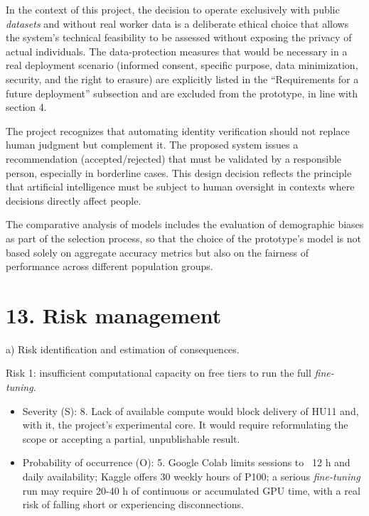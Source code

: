 \documentclass[
  11pt, %
]{charter}
\begin{document}
In the context of this project, the decision to operate exclusively with public \textit{datasets} and without real worker data is a deliberate ethical choice that allows the system's technical feasibility to be assessed without exposing the privacy of actual individuals. The data-protection measures that would be necessary in a real deployment scenario (informed consent, specific purpose, data minimization, security, and the right to erasure) are explicitly listed in the ``Requirements for a future deployment'' subsection and are excluded from the prototype, in line with section 4.

The project recognizes that automating identity verification should not replace human judgment but complement it. The proposed system issues a recommendation (accepted/rejected) that must be validated by a responsible person, especially in borderline cases. This design decision reflects the principle that artificial intelligence must be subject to human oversight in contexts where decisions directly affect people.

The comparative analysis of models includes the evaluation of demographic biases as part of the selection process, so that the choice of the prototype's model is not based solely on aggregate accuracy metrics but also on the fairness of performance across different population groups.

\section{13. Risk management}
\label{sec:riesgos}

a) Risk identification and estimation of consequences.

Risk 1: insufficient computational capacity on free tiers to run the full \textit{fine-tuning}.

\begin{itemize}
\item Severity (S): 8. Lack of available compute would block delivery of HU11 and, with it, the project's experimental core. It would require reformulating the scope or accepting a partial, unpublishable result.
\item Probability of occurrence (O): 5. Google Colab limits sessions to ~12 h and daily availability; Kaggle offers 30 weekly hours of P100; a serious \textit{fine-tuning} run may require 20-40 h of continuous or accumulated GPU time, with a real risk of falling short or experiencing disconnections.
\end{itemize}
\end{document}
